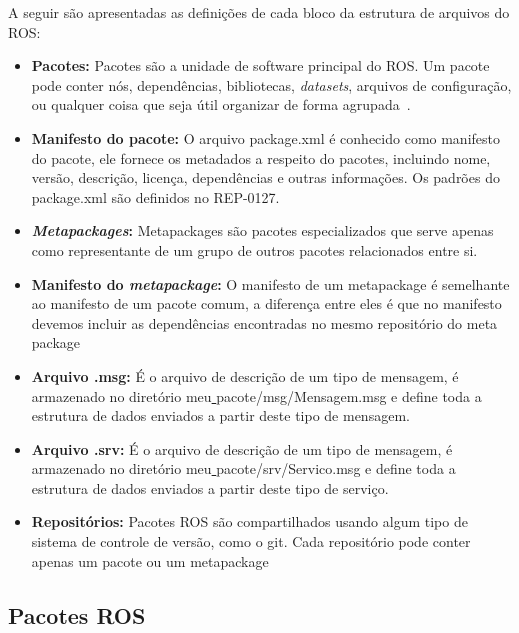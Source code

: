 A seguir são apresentadas as definições de cada bloco da estrutura de arquivos do ROS\@:
\begin{itemize}
    \item \textbf{Pacotes:} Pacotes são a unidade de software principal do ROS\@. Um pacote pode conter nós, dependências, bibliotecas, \textit{datasets}, arquivos de configuração, ou qualquer coisa que seja útil organizar de forma agrupada~\cite{RosPKG}.

    \item \textbf{Manifesto do pacote:} O arquivo package.xml é conhecido como manifesto do pacote, ele fornece os metadados a respeito do pacotes, incluindo nome, versão, descrição, licença, dependências e outras informações. Os padrões do package.xml são definidos no REP-0127.
    
    \item \textbf{\textit{Metapackages}:} Metapackages são pacotes especializados que serve apenas como representante de um grupo de outros pacotes relacionados entre si.
    
    \item \textbf{Manifesto do \textit{metapackage}:} O manifesto de um metapackage é semelhante ao manifesto de um pacote comum, a diferença entre eles é que no manifesto devemos incluir as dependências encontradas no mesmo repositório do meta package
    
    \item \textbf{Arquivo .msg:} É o arquivo de descrição de um tipo de mensagem, é armazenado no diretório meu\underline{ }pacote/msg/Mensagem.msg e define toda a estrutura de dados enviados a partir deste tipo de mensagem.
    
    \item \textbf{Arquivo .srv:} É o arquivo de descrição de um tipo de mensagem, é armazenado no diretório meu\underline{ }pacote/srv/Servico.msg e define toda a estrutura de dados enviados a partir deste tipo de serviço.
    
    \item \textbf{Repositórios:} Pacotes ROS são compartilhados usando algum tipo de sistema de controle de versão, como o git. Cada repositório pode conter apenas um pacote ou um metapackage 
\end{itemize}


\subsection{Pacotes ROS}

